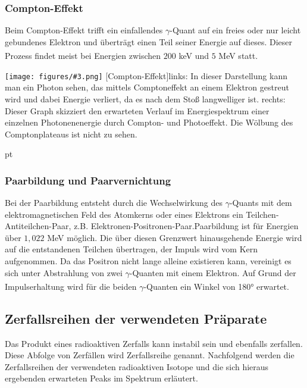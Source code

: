 \documentclass[12pt,listof=totoc]{scrartcl}
\newcommand{\graShort}[4][0.7]{
	\begin{minipage}[h!]{\textwidth}
		\centering
		\texttt{[image: figures/\#3.png]}
		\captionof{figure}[#2]{#4}
	\end{minipage}
	\vskip 30 pt
}
\begin{document}
 \subsubsection{Compton-Effekt}
 Beim Compton-Effekt trifft ein einfallendes $\gamma$-Quant auf ein freies oder nur leicht gebundenes Elektron und überträgt einen Teil seiner Energie auf dieses. Dieser Prozess findet meist bei Energien zwischen $200$ keV und $5$ MeV statt.\textsuperscript{\cite{anleitung1}}
 

 \graShort{Compton-Effekt}{Compton}{links: In dieser Darstellung kann man ein Photon sehen, das mittels Comptoneffekt an einem Elektron gestreut wird und dabei Energie verliert, da es nach dem Stoß langwelliger ist.\cite{staat} rechts: Dieser Graph skizziert den erwarteten Verlauf im Energiespektrum einer einzelnen
 Photonenenergie durch Compton- und Photoeffekt. Die Wölbung des Comptonplateaus ist nicht zu
 sehen.\cite{med}}
 \subsubsection{Paarbildung und Paarvernichtung \label{PVN1}}
 Bei der Paarbildung entsteht durch die Wechselwirkung des $\gamma$-Quants mit dem elektromagnetischen Feld des Atomkerns oder eines Elektrons ein Teilchen-Antiteilchen-Paar, z.B. Elektronen-Positronen-Paar.Paarbildung ist für Energien über $1,022$ MeV möglich. Die über diesen Grenzwert hinausgehende Energie wird auf die entstandenen Teilchen übertragen, der Impuls wird vom Kern aufgenommen. Da das Positron nicht lange alleine existieren kann, vereinigt es sich unter Abstrahlung von zwei $\gamma$-Quanten mit einem Elektron. Auf Grund der Impulserhaltung wird für die beiden $\gamma$-Quanten ein Winkel von 180° erwartet. \textsuperscript{\cite{anleitung}}
 
 \subsection{Zerfallsreihen der verwendeten Präparate \label{ZR}}
 
 Das Produkt eines radioaktiven Zerfalls kann instabil sein und ebenfalls zerfallen. Diese
 Abfolge von Zerfällen wird Zerfallsreihe genannt. Nachfolgend werden die Zerfallsreihen der verwendeten radioaktiven Isotope und die sich hieraus ergebenden erwarteten Peaks im Spektrum erläutert.
 
\end{document}
